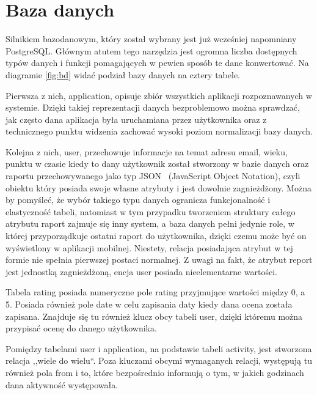 \documentclass[a4paper,twoside,12pt]{book}
\begin{document}
\section{Baza danych}
\label{db}
Silnikiem bazodanowym, który został wybrany jest już wcześniej napomniany PostgreSQL. Głównym atutem tego narzędzia jest ogromna liczba dostępnych typów danych i funkcji pomagających w pewien sposób te dane konwertować. Na diagramie \ref{fig:bd} widać podział bazy danych na cztery tabele.

Pierwsza z nich, application, opisuje zbiór wszystkich aplikacji rozpoznawanych w systemie. Dzięki takiej reprezentacji danych bezproblemowo można sprawdzać, jak często dana aplikacja była uruchamiana przez użytkownika oraz z technicznego punktu widzenia zachować wysoki poziom normalizacji bazy danych. 

Kolejna z nich, user, przechowuje informacje na temat adresu email, wieku, punktu w czasie kiedy to dany użytkownik został stworzony w bazie danych oraz raportu przechowywanego jako typ JSON~\cite{psqjson} (JavaScript Object Notation), czyli obiektu który posiada swoje własne atrybuty i jest dowolnie zagnieżdżony. Można by pomyśleć, że wybór takiego typu danych ogranicza funkcjonalność i elastyczność tabeli, natomiast w tym przypadku tworzeniem struktury całego atrybutu raport zajmuje się inny system, a baza danych pełni jedynie role, w której przyporządkuje ostatni raport do użytkownika, dzięki czemu może być on wyświetlony w aplikacji mobilnej. Niestety, relacja posiadająca atrybut w tej formie nie spełnia pierwszej postaci normalnej. Z uwagi na fakt, że atrybut report jest jednostką zagnieżdżoną, encja user posiada nieelementarne wartości. 

Tabela rating posiada numeryczne pole rating przyjmujące wartości między 0, a 5. Posiada również pole date w celu zapisania daty kiedy dana ocena została zapisana. Znajduje się tu również klucz obcy tabeli user, dzięki któremu można przypisać ocenę do danego użytkownika.

Pomiędzy tabelami user i application, na podstawie tabeli activity, jest stworzona relacja ,,wiele do wielu``. Poza kluczami obcymi wymaganych relacji, występują tu również pola from i to, które bezpośrednio informują o tym, w jakich godzinach dana aktywność występowała.
\end{document}
